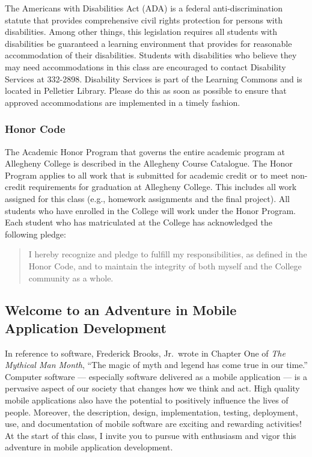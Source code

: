 The Americans with Disabilities Act (ADA) is a federal anti-discrimination statute that provides comprehensive civil
rights protection for persons with disabilities.  Among other things, this legislation requires all students with
disabilities be guaranteed a learning environment that provides for reasonable accommodation of their disabilities.
Students with disabilities who believe they may need accommodations in this class are encouraged to contact Disability
Services at 332-2898.  Disability Services is part of the Learning Commons and is located in Pelletier Library.
Please do this as soon as possible to ensure that approved accommodations are implemented in a timely fashion.

\subsubsection*{Honor Code}

The Academic Honor Program that governs the entire academic program at Allegheny College is described in the Allegheny
Course Catalogue.  The Honor Program applies to all work that is submitted for academic credit or to meet non-credit
requirements for graduation at Allegheny College.  This includes all work assigned for this class (e.g., homework
assignments and the final project).  All students who have enrolled in the College will work under the Honor Program.
Each student who has matriculated at the College has acknowledged the following pledge:

\vspace*{-.1in}
\begin{quote}
I hereby recognize and pledge to fulfill my responsibilities, as defined in the Honor Code, and to maintain the
integrity of both myself and the College community as a whole.  
\end{quote}
\vspace*{-.15in}

\subsection*{Welcome to an Adventure in Mobile Application Development}

In reference to software, Frederick Brooks, Jr.\ wrote in Chapter One of {\em The Mythical Man Month}, ``The magic of
myth and legend has come true in our time.'' Computer software --- especially software delivered as a mobile application
--- is a pervasive aspect of our society that changes how we think and act.  High quality mobile applications also have
the potential to positively influence the lives of people. Moreover, the description, design, implementation, testing,
deployment, use, and documentation of mobile software are exciting and rewarding activities!  At the start of this class, I
invite you to pursue with enthusiasm and vigor this adventure in mobile application development.


